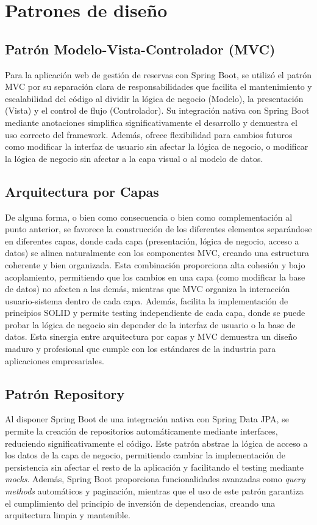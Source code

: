 \section{Patrones de diseño}\label{patron-de-diseño}

\subsection{Patrón Modelo-Vista-Controlador (MVC)}\label{patron-modelo-vista-controlador}
Para la aplicación web de gestión de reservas con Spring Boot, se utilizó el patrón MVC por su separación clara de responsabilidades que facilita el mantenimiento y escalabilidad del código al dividir la lógica de negocio (Modelo), la presentación (Vista) y el control de flujo (Controlador). Su integración nativa con Spring Boot mediante anotaciones simplifica significativamente el desarrollo y demuestra el uso correcto del framework. Además, ofrece flexibilidad para cambios futuros como modificar la interfaz de usuario sin afectar la lógica de negocio, o modificar la lógica de negocio sin afectar a la capa visual o al modelo de datos.

\subsection{Arquitectura por Capas}\label{arquitectura-por-capas}
De alguna forma, o bien como consecuencia o bien como complementación al punto anterior, se favorece la construcción de los diferentes elementos separándose en diferentes capas, donde cada capa (presentación, lógica de negocio, acceso a datos) se alinea naturalmente con los componentes MVC, creando una estructura coherente y bien organizada. Esta combinación proporciona alta cohesión y bajo acoplamiento, permitiendo que los cambios en una capa (como modificar la base de datos) no afecten a las demás, mientras que MVC organiza la interacción usuario-sistema dentro de cada capa. Además, facilita la implementación de principios SOLID y permite testing independiente de cada capa, donde se puede probar la lógica de negocio sin depender de la interfaz de usuario o la base de datos. Esta sinergia entre arquitectura por capas y MVC demuestra un diseño maduro y profesional que cumple con los estándares de la industria para aplicaciones empresariales.

\subsection{Patrón Repository}\label{patron-repository}
Al disponer Spring Boot de una integración nativa con Spring Data JPA, se permite la creación de repositorios automáticamente mediante interfaces, reduciendo significativamente el código. Este patrón abstrae la lógica de acceso a los datos de la capa de negocio, permitiendo cambiar la implementación de persistencia sin afectar el resto de la aplicación y facilitando el testing mediante \emph{mocks}. Además, Spring Boot proporciona funcionalidades avanzadas como \emph{query methods} automáticos y paginación, mientras que el uso de este patrón garantiza el cumplimiento del principio de inversión de dependencias, creando una arquitectura limpia y mantenible.

